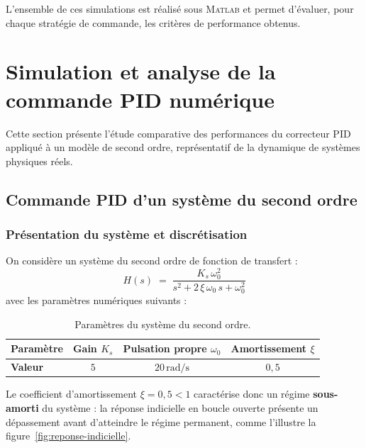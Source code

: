 L'ensemble de ces simulations est réalisé sous \textsc{Matlab} et permet d'évaluer, pour chaque stratégie de commande, les critères de performance obtenus.

\section{Simulation et analyse de la commande PID numérique}

Cette section présente l'étude comparative des performances du correcteur PID appliqué à un modèle de second ordre, représentatif de la dynamique de systèmes physiques réels.

\subsection{Commande PID d'un système du second ordre}

\subsubsection{Présentation du système et discrétisation}

On considère un système du second ordre de fonction de transfert :
\begin{equation}
	H(s) \;=\; \frac{K_s\,\omega_0^2}
	{s^2 + 2\,\xi\,\omega_0\,s + \omega_0^2}
	\label{eq:sys_2ordre}
\end{equation}
avec les paramètres numériques suivants :

\begin{table}[H]
	\centering
	\caption{Paramètres du système du second ordre.}
	\renewcommand{\arraystretch}{1.3}
	\begin{tabular}{lccc}
		\hline
		\textbf{Paramètre} & Gain $K_s$ & Pulsation propre $\omega_0$
		& Amortissement $\xi$ \\
		\hline
		\textbf{Valeur}    & $5$        & $20\,\text{rad/s}$ & $0{,}5$ \\
		\hline
	\end{tabular}
	\label{tab:params_sys_2ordre}
\end{table}

Le coefficient d'amortissement $\xi = 0{,}5 < 1$ caractérise donc un régime \textbf{sous-amorti} du système : la réponse indicielle en boucle ouverte présente un dépassement avant d'atteindre le régime permanent, comme l'illustre la figure~\ref{fig:reponse-indicielle}.

